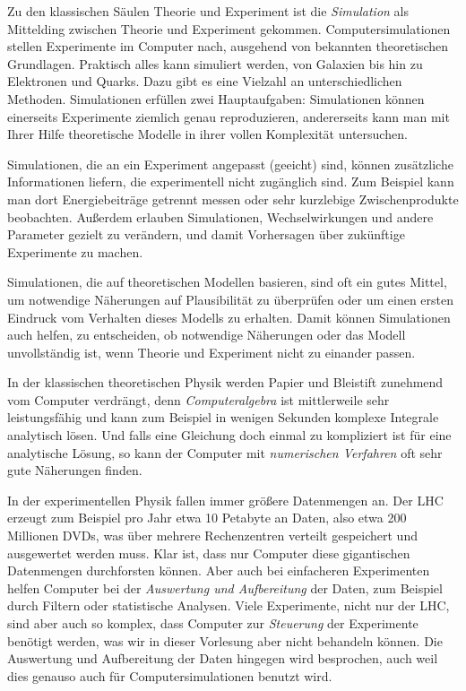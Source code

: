 Zu den klassischen Säulen Theorie und Experiment ist die
\emph{Simulation} als Mittelding zwischen Theorie und Experiment
gekommen. Computersimulationen stellen Experimente im Computer nach,
ausgehend von bekannten theoretischen Grundlagen. Praktisch alles kann
simuliert werden, von Galaxien bis hin zu Elektronen und Quarks. Dazu
gibt es eine Vielzahl an unterschiedlichen Methoden. Simulationen
erfüllen zwei Hauptaufgaben: Simulationen können einerseits
Experimente ziemlich genau reproduzieren, andererseits kann man mit
Ihrer Hilfe theoretische Modelle in ihrer vollen Komplexität
untersuchen.

Simulationen, die an ein Experiment angepasst (geeicht) sind, können
zusätzliche Informationen liefern, die experimentell nicht zugänglich
sind. Zum Beispiel kann man dort Energiebeiträge getrennt messen oder
sehr kurzlebige Zwischenprodukte beobachten. Außerdem erlauben
Simulationen, Wechselwirkungen und andere Parameter gezielt zu
verändern, und damit Vorhersagen über zukünftige Experimente zu
machen.

Simulationen, die auf theoretischen Modellen basieren, sind oft ein
gutes Mittel, um notwendige Näherungen auf Plausibilität zu überprüfen
oder um einen ersten Eindruck vom Verhalten dieses Modells zu
erhalten. Damit können Simulationen auch helfen, zu entscheiden, ob
notwendige Näherungen oder das Modell unvollständig ist, wenn Theorie
und Experiment nicht zu einander passen.

In der klassischen theoretischen Physik werden Papier und Bleistift
zunehmend vom Computer verdrängt, denn \emph{Computeralgebra} ist
mittlerweile sehr leistungsfähig und kann zum Beispiel in wenigen
Sekunden komplexe Integrale analytisch lösen. Und falls eine Gleichung
doch einmal zu kompliziert ist für eine analytische Lösung, so kann
der Computer mit \emph{numerischen Verfahren} oft sehr gute Näherungen
finden.

In der experimentellen Physik fallen immer größere Datenmengen an. Der
LHC erzeugt zum Beispiel pro Jahr etwa 10 Petabyte an Daten, also etwa
200 Millionen DVDs, was über mehrere Rechenzentren verteilt
gespeichert und ausgewertet werden muss. Klar ist, dass nur Computer
diese gigantischen Datenmengen durchforsten können. Aber auch bei
einfacheren Experimenten helfen Computer bei der \emph{Auswertung und
  Aufbereitung} der Daten, zum Beispiel durch Filtern oder
statistische Analysen. Viele Experimente, nicht nur der LHC, sind aber
auch so komplex, dass Computer zur \emph{Steuerung} der Experimente
benötigt werden, was wir in dieser Vorlesung aber nicht behandeln
können. Die Auswertung und Aufbereitung der Daten hingegen wird
besprochen, auch weil dies genauso auch für Computersimulationen
benutzt wird.

